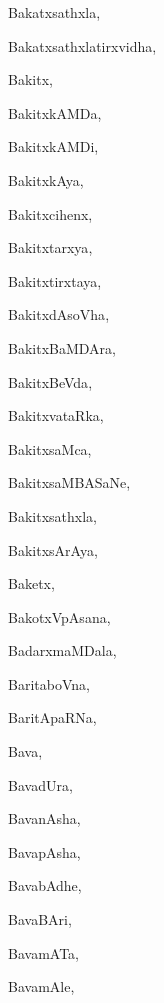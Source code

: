 \begin{multicols}{3}
{\noindent
{Bakatxsathxla}, \pageref{Bakatxsathxla}

\noindent
{Bakatxsathxlatirxvidha}, \pageref{Bakatxsathxlatirxvidha}

\noindent
{Bakitx}, \pageref{Bakitx}

\noindent
{BakitxkAMDa}, \pageref{BakitxkAMDa}

\noindent
{BakitxkAMDi}, \pageref{BakitxkAMDi}

\noindent
{BakitxkAya}, \pageref{BakitxkAya}

\noindent
{Bakitxcihenx}, \pageref{Bakitxcihenx}

\noindent
{Bakitxtarxya}, \pageref{Bakitxtarxya}

\noindent
{Bakitxtirxtaya}, \pageref{Bakitxtirxtaya}

\noindent
{BakitxdAsoVha}, \pageref{BakitxdAsoVha}

\noindent
{BakitxBaMDAra}, \pageref{BakitxBaMDAra}

\noindent
{BakitxBeVda}, \pageref{BakitxBeVda}

\noindent
{BakitxvataRka}, \pageref{BakitxvataRka}

\noindent
{BakitxsaMca}, \pageref{BakitxsaMca}

\noindent
{BakitxsaMBASaNe}, \pageref{BakitxsaMBASaNe}

\noindent
{Bakitxsathxla}, \pageref{Bakitxsathxla}

\noindent
{BakitxsArAya}, \pageref{BakitxsArAya}

\noindent
{Baketx}, \pageref{Baketx}

\noindent
{BakotxVpAsana}, \pageref{BakotxVpAsana}

\noindent
{BadarxmaMDala}, \pageref{BadarxmaMDala}

\noindent
{BaritaboVna}, \pageref{BaritaboVna}

\noindent
{BaritApaRNa}, \pageref{BaritApaRNa}

\noindent
{Bava}, \pageref{Bava}

\noindent
{BavadUra}, \pageref{BavadUra}

\noindent
{BavanAsha}, \pageref{BavanAsha}

\noindent
{BavapAsha}, \pageref{BavapAsha}

\noindent
{BavabAdhe}, \pageref{BavabAdhe}

\noindent
{BavaBAri}, \pageref{BavaBAri}

\noindent
{BavamATa}, \pageref{BavamATa}

\noindent
{BavamAle}, \pageref{BavamAle}

}
\end{multicols}
